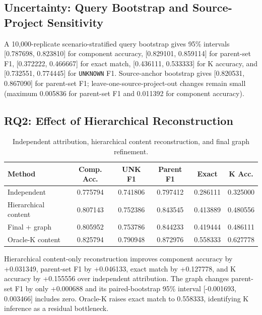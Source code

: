 \documentclass[runningheads]{llncs}
\begin{document}
\subsection{Uncertainty: Query Bootstrap and Source-Project Sensitivity}
A 10,000-replicate scenario-stratified query bootstrap gives 95\% intervals [0.787698, 0.823810] for component accuracy, [0.829101, 0.859114] for parent-set F1, [0.372222, 0.466667] for exact match, [0.436111, 0.533333] for K accuracy, and [0.732551, 0.774445] for \texttt{UNKNOWN} F1. Source-anchor bootstrap gives [0.820531, 0.867090] for parent-set F1; leave-one-source-project-out changes remain small (maximum 0.005836 for parent-set F1 and 0.011392 for component accuracy).

\subsection{RQ2: Effect of Hierarchical Reconstruction}
\begin{table}[!htbp]
\centering
\caption{Independent attribution, hierarchical content reconstruction, and final graph refinement.}
\label{tab:ablation}
\scriptsize
\begin{tabular}{lccccc}
\toprule
Method & Comp. Acc. & UNK F1 & Parent F1 & Exact & K Acc.\\
\midrule
Independent & 0.775794 & 0.741806 & 0.797412 & 0.286111 & 0.325000\\
Hierarchical content & 0.807143 & 0.752386 & 0.843545 & 0.413889 & 0.480556\\
Final + graph & 0.805952 & 0.753786 & 0.844233 & 0.419444 & 0.486111\\
Oracle-K content & 0.825794 & 0.790948 & 0.872976 & 0.558333 & 0.627778\\
\bottomrule
\end{tabular}
\end{table}
Hierarchical content-only reconstruction improves component accuracy by +0.031349, parent-set F1 by +0.046133, exact match by +0.127778, and K accuracy by +0.155556 over independent attribution. The graph changes parent-set F1 by only +0.000688 and its paired-bootstrap 95\% interval [-0.001693, 0.003466] includes zero. Oracle-K raises exact match to 0.558333, identifying K inference as a residual bottleneck.
\end{document}
